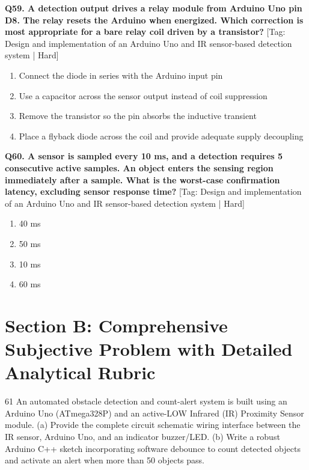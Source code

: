 \noindent\textbf{Q59. A detection output drives a relay module from Arduino Uno pin D8. The relay resets the Arduino when energized. Which correction is most appropriate for a bare relay coil driven by a transistor?} \hfill [Tag: Design and implementation of an Arduino Uno and IR sensor-based detection system | Hard]
\begin{enumerate}[label=(\alph*),topsep=2pt,itemsep=1pt,partopsep=0pt,parsep=0pt]
    \item {Connect the diode in series with the Arduino input pin}
    \item {Use a capacitor across the sensor output instead of coil suppression}
    \item {Remove the transistor so the pin absorbs the inductive transient}
    \item {Place a flyback diode across the coil and provide adequate supply decoupling}
\end{enumerate}
\vspace{2mm}

\noindent\textbf{Q60. A sensor is sampled every 10 ms, and a detection requires 5 consecutive active samples. An object enters the sensing region immediately after a sample. What is the worst-case confirmation latency, excluding sensor response time?} \hfill [Tag: Design and implementation of an Arduino Uno and IR sensor-based detection system | Hard]
\begin{enumerate}[label=(\alph*),topsep=2pt,itemsep=1pt,partopsep=0pt,parsep=0pt]
    \item {40 ms}
    \item {50 ms}
    \item {10 ms}
    \item {60 ms}
\end{enumerate}
\vspace{2mm}


\newpage
\section{Section B: Comprehensive Subjective Problem with Detailed Analytical Rubric}

\begin{subjectiveq}{6}{1}
An automated obstacle detection and count-alert system is built using an Arduino Uno (ATmega328P) and an active-LOW Infrared (IR) Proximity Sensor module. (a) Provide the complete circuit schematic wiring interface between the IR sensor, Arduino Uno, and an indicator buzzer/LED. (b) Write a robust Arduino C++ sketch incorporating software debounce to count detected objects and activate an alert when more than 50 objects pass.
\end{subjectiveq}

